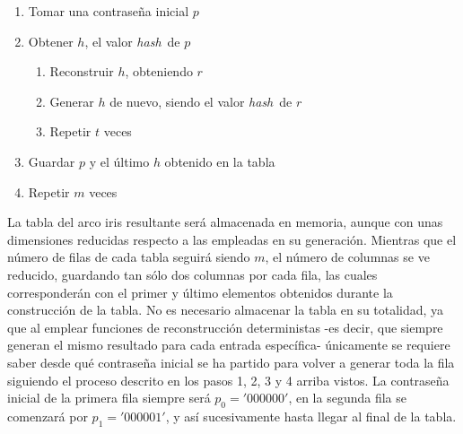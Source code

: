 \documentclass[12pt,spanish,listoffigures,listoftables]{tfgetsinf}
\newcommand{\hash}{\textit{hash}}
\begin{document}
\begin{enumerate}[label*=\arabic*.]

    \item Tomar una contraseña inicial $p$
    
    \item Obtener $h$, el valor \hash~de $p$
    
    \begin{enumerate}[label*=\arabic*.]
    
        \item Reconstruir $h$, obteniendo $r$
        
        \item Generar $h$ de nuevo, siendo el valor \hash~de $r$
        
        \item Repetir $t$ veces
        
    \end{enumerate}
    
    \item Guardar $p$ y el último $h$ obtenido en la tabla
    
    \item Repetir $m$ veces
    
\end{enumerate}

La tabla del arco iris resultante será almacenada en memoria, aunque con unas dimensiones reducidas respecto a las empleadas en su generación. Mientras que el número de filas de cada tabla seguirá siendo $m$, el número de columnas se ve reducido, guardando tan sólo dos columnas por cada fila, las cuales corresponderán con el primer y último elementos obtenidos durante la construcción de la tabla. No es necesario almacenar la tabla en su totalidad, ya que al emplear funciones de reconstrucción deterministas -es decir, que siempre generan el mismo resultado para cada entrada específica- únicamente se requiere saber desde qué contraseña inicial se ha partido para volver a generar toda la fila siguiendo el proceso descrito en los pasos 1, 2, 3 y 4 arriba vistos. La contraseña inicial de la primera fila siempre será $p_0 = '000000'$, en la segunda fila se comenzará por $p_1 = '000001'$, y así sucesivamente hasta llegar al final de la tabla.
\end{document}

